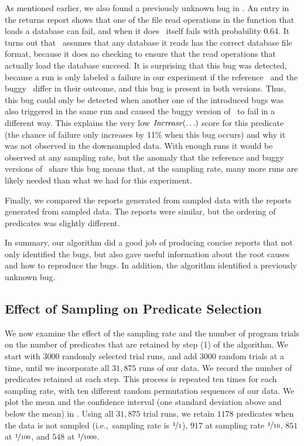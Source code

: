 As mentioned earlier,  we also found a  previously unknown bug in \moss.
An entry in the returns report shows that one of
the file read operations in the function that loads a database can
fail, and when it does \moss\ itself fails with probability 0.64.
It turns out that \moss\ assumes that any database it reads has the
correct database file format, because it does no checking to ensure
that the read operations that actually load the database succeed.  
It is surprising that this bug was detected,
because a run is only labeled a failure in our experiment if the
reference \moss\ and the buggy \moss\ differ in their outcome, and
this bug is present in both versions.  Thus, this bug could only be detected
when another one of the introduced bugs was also triggered in the same
run and caused the buggy version of \moss\ to fail in a different way.
This explains the very low $\mbox{\textit{Increase}}(\ldots)$ score for this
predicate (the chance of failure only increases by 11\% when this bug
occurs) and why it was not observed in the 
downsampled data.  With enough runs it would be observed at
any sampling rate, but the anomaly that the reference and buggy
versions of \moss\ share this bug means that, at the
 sampling rate, many more runs are likely needed
than what we had for this experiment.

Finally, we compared the reports generated from  sampled data
with the reports generated from  sampled data.  The reports were
similar, but the ordering of  predicates was slightly different.

In summary, our algorithm did a good job of producing concise reports that not
only identified the bugs, but also gave useful information about the root causes and
how to reproduce the bugs.  In addition, the algorithm identified a previously unknown
bug.

\subsection{Effect of Sampling on Predicate Selection}

We now examine the effect of the sampling rate and the number of
program trials on the number of predicates that are retained by step
(1) of the algorithm.
We start with $3000$ randomly
selected trial runs, and add $3000$ random trials at a time, until we
incorporate all $31,875$ runs of our data.  We record the number of
predicates retained at each step.  This process is repeated ten times
for each sampling rate, with ten different random permutation sequences
of our data. We plot the mean and the confidence interval (one
standard deviation above and below the mean) in
.  Using all $31,875$ trial runs, we retain $1178$ 
predicates when the data is not sampled (i.e.,\ sampling rate is 
$\nicefrac{1}{1}$), $917$ at sampling
rate $\nicefrac{1}{10}$, $851$ at $\nicefrac{1}{100}$, and $548$ at
$\nicefrac{1}{1000}$.

